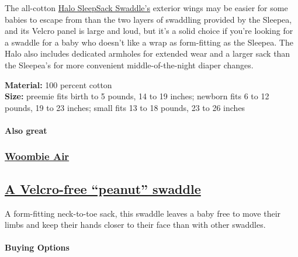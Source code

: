The all-cotton
\href{https://www.nytimes3xbfgragh.onion/wirecutter/out/link/30687/162166/4/86636/?merchant=BuyBuy\%20Baby}{Halo
SleepSack Swaddle's} exterior wings may be easier for some babies to
escape from than the two layers of swaddling provided by the Sleepea,
and its Velcro panel is large and loud, but it's a solid choice if
you're looking for a swaddle for a baby who doesn't like a wrap as
form-fitting as the Sleepea. The Halo also includes dedicated armholes
for extended wear and a larger sack than the Sleepea's for more
convenient middle-of-the-night diaper changes.

\textbf{Material:} 100 percent cotton\\
\textbf{Size:} preemie fits birth to 5 pounds, 14 to 19 inches; newborn
fits 6 to 12 pounds, 19 to 23 inches; small fits 13 to 18 pounds, 23 to
26 inches

\hypertarget{also-great}{%
\paragraph{Also great}\label{also-great}}

\href{https://www.nytimes3xbfgragh.onion/wirecutter/out/link/30688/154051/4/86634?merchant=BuyBuy\%20Baby}{}

\hypertarget{woombie-air}{%
\subsubsection{\texorpdfstring{\href{https://www.nytimes3xbfgragh.onion/wirecutter/out/link/30688/154051/4/86634?merchant=BuyBuy\%20Baby}{Woombie
Air}}{Woombie Air}}\label{woombie-air}}

\hypertarget{a-velcro-free-peanut-swaddle}{%
\subsection{\texorpdfstring{\href{https://www.nytimes3xbfgragh.onion/wirecutter/out/link/30688/154051/4/86634?merchant=BuyBuy\%20Baby}{A
Velcro-free ``peanut''
swaddle}}{A Velcro-free ``peanut'' swaddle}}\label{a-velcro-free-peanut-swaddle}}

A form-fitting neck-to-toe sack, this swaddle leaves a baby free to move
their limbs and keep their hands closer to their face than with other
swaddles.

\hypertarget{buying-options-2}{%
\paragraph{Buying Options}\label{buying-options-2}}

